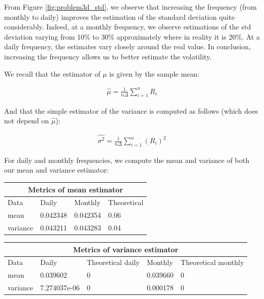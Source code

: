 \documentclass[10pt]{article}
\newenvironment{exercise}[2][Exercise]{\begin{trivlist}
  \item[\hskip \labelsep {\bfseries #1}\hskip \labelsep {\bfseries #2.}]}{\end{trivlist}}
\begin{document}
\begin{exercise}{3}
	\smallbreak
	
	From Figure \ref{fig:problem3d_std}, we observe that increasing the frequency (from monthly to daily) improves the estimation of the standard deviation quite considerably. Indeed, at a monthly frequency, we observe estimations of the std deviation varying from 10\% to 30\% approximately where in reality it is 20\%. At a daily frequency, the estimates vary closely around the real value. In conclusion, increasing the frequency allows us to better estimate the volatility. 
  
	\bigbreak
	
	 We recall that the estimator of $\mu$ is given by the sample mean:
	 
	\begin{align*}
		\hat{\mu} = \frac{1}{n \Delta}\sum^{n}_{i = 1}R_{i}
	\end{align*}
	
	And that the simple estimator of the variance is computed as follows (which does not depend on $\hat{\mu}$):
	
	\begin{align*}
		\hat{\sigma^{2}} = \frac{1}{n \Delta}\sum^{n}_{i = 1}(R_{i})^{2}
	\end{align*}
	 
	 For daily and monthly frequencies, we compute the mean and variance of both our mean and variance estimator:
	 
	 \bigbreak
	 
	 \begin{tabular}{ |p{3cm}||p{3cm}|p{3cm}|p{3cm}| }
		\hline
	 	\multicolumn{4}{|c|}{Metrics of mean estimator} \\
	 	\hline
	 	Data & Daily & Monthly & Theoretical\\
 		\hline
 		mean  &  0.042348 & 0.042354 & 0.06 \\
 		variance & 0.043211 & 0.043283 & 0.04\\
 		\hline
	\end{tabular}
	
	\bigbreak	
	
	\begin{tabular}{ |p{2cm}||p{2cm}|p{3cm}|p{2cm}|p{3cm}| }
		\hline
	 	\multicolumn{5}{|c|}{Metrics of variance estimator} \\
	 	\hline
	 	Data & Daily & Theoretical daily  & Monthly & Theoretical monthly \\
 		\hline
 		mean  &  0.039602 & 0 & 0.039660 & 0 \\
 		variance & 7.274037e-06 & 0 & 0.000178 & 0 \\
 		\hline
	\end{tabular}
	
	\bigbreak
  
  \end{exercise}



\end{document}
